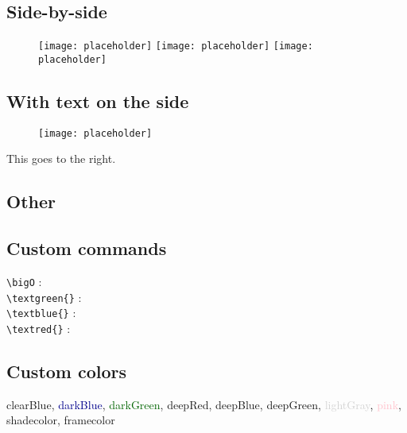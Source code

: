 \documentclass{customSynthesis}
\begin{document}
\subsection*{Side-by-side}

\begin{figure}[H]
    \centering
    \texttt{[image: placeholder]}\hfill
	\texttt{[image: placeholder]}\hfill
	\texttt{[image: placeholder]}
\end{figure}

\subsection*{With text on the side}

\begin{minipage}{0.48\textwidth}
	\begin{figure}[H]
		\centering
		\texttt{[image: placeholder]}
	\end{figure}
\end{minipage}
\begin{minipage}{0.5\textwidth}
	This goes to the right.
\end{minipage}

\subsection*{Other}

\subsection*{Custom commands}

\verb|\bigO| : \bigO\\
\verb|\textgreen{}| : \\
\verb|\textblue{}| : \\
\verb|\textred{}| : 

\subsection*{Custom colors}

\textcolor{clearBlue}{clearBlue}, \textcolor{darkBlue}{darkBlue}, \textcolor{darkGreen}{darkGreen}, \textcolor{deepRed}{deepRed}, \textcolor{deepBlue}{deepBlue}, \textcolor{deepGreen}{deepGreen}, \textcolor{lightGray}{lightGray}, \textcolor{pink}{pink}, \textcolor{shadecolor}{shadecolor}, \textcolor{framecolor}{framecolor}
\end{document}
